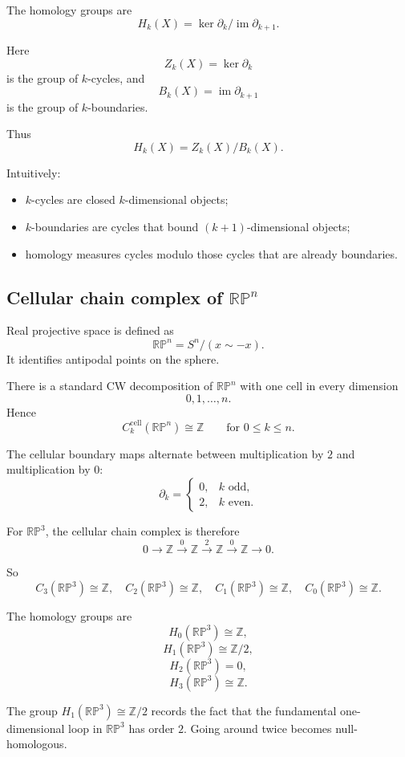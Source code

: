 \documentclass[12pt,a4paper]{article}
\theoremstyle{notespace}
\begin{document}
The homology groups are
\[
H_k(X)=\ker \partial_k/\operatorname{im}\partial_{k+1}.
\]

Here
\[
Z_k(X)=\ker \partial_k
\]
is the group of \(k\)-cycles, and
\[
B_k(X)=\operatorname{im}\partial_{k+1}
\]
is the group of \(k\)-boundaries.

Thus
\[
H_k(X)=Z_k(X)/B_k(X).
\]

Intuitively:
\begin{itemize}
	\item \(k\)-cycles are closed \(k\)-dimensional objects;
	\item \(k\)-boundaries are cycles that bound \((k+1)\)-dimensional objects;
	\item homology measures cycles modulo those cycles that are already boundaries.
\end{itemize}

\subsection{Cellular chain complex of \(\mathbb{RP}^n\)}

Real projective space is defined as
\[
\mathbb{RP}^n=S^n/(x\sim -x).
\]
It identifies antipodal points on the sphere.

There is a standard CW decomposition of \(\mathbb{RP}^n\) with one cell in every dimension
\[
0,1,\dots,n.
\]
Hence
\[
C_k^{\mathrm{cell}}(\mathbb{RP}^n)\cong \mathbb Z
\qquad
\text{for }0\leq k\leq n.
\]

The cellular boundary maps alternate between multiplication by \(2\) and multiplication by \(0\):
\[
\partial_k=
\begin{cases}
	0, & k \text{ odd},\\
	2, & k \text{ even}.
\end{cases}
\]

For \(\mathbb{RP}^3\), the cellular chain complex is therefore
\[
0
\longrightarrow
\mathbb Z
\xrightarrow{0}
\mathbb Z
\xrightarrow{2}
\mathbb Z
\xrightarrow{0}
\mathbb Z
\longrightarrow 0.
\]

So
\[
C_3(\mathbb{RP}^3)\cong \mathbb Z,
\quad
C_2(\mathbb{RP}^3)\cong \mathbb Z,
\quad
C_1(\mathbb{RP}^3)\cong \mathbb Z,
\quad
C_0(\mathbb{RP}^3)\cong \mathbb Z.
\]

The homology groups are
\[
H_0(\mathbb{RP}^3)\cong \mathbb Z,
\]
\[
H_1(\mathbb{RP}^3)\cong \mathbb Z/2,
\]
\[
H_2(\mathbb{RP}^3)=0,
\]
\[
H_3(\mathbb{RP}^3)\cong \mathbb Z.
\]

The group \(H_1(\mathbb{RP}^3)\cong \mathbb Z/2\) records the fact that the fundamental one-dimensional loop in \(\mathbb{RP}^3\) has order \(2\). Going around twice becomes null-homologous.
\end{document}
